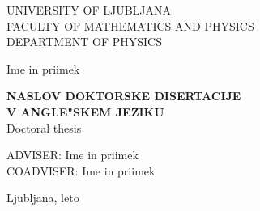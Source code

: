 \def\epsfg#1#2{\epsfig{file=#1.eps,width=#2}} 
\def\legendamp#1#2{\vbox{\hsize=#1\caption{\small #2}}}

\setcounter{topnumber}{4}
\setcounter{bottomnumber}{4}
\setcounter{totalnumber}{5}
\renewcommand{\topfraction}{0.99}
\renewcommand{\bottomfraction}{0.99}
\renewcommand{\textfraction}{0.0}
\setlength{\tabcolsep}{10pt}
\renewcommand{\arraystretch}{1.5}

\def\bi#1{\hbox{\boldmath{$#1$}}}
\let\oldvec\vec
\def\vec#1{\mbox{\boldmath$#1$}}
\def\pol{{\textstyle{1\over2}}}
\def\svec#1{\mbox{{\scriptsize \boldmath$#1$}}}



\nocite{*}


\pagestyle{empty}
\begin{center}

{\large UNIVERSITY OF LJUBLJANA\\
FACULTY OF MATHEMATICS AND PHYSICS\\
DEPARTMENT OF PHYSICS\\}

\vspace{4cm}

{\Large Ime in priimek\\}

\vspace{10mm}

{\bf \Large NASLOV DOKTORSKE DISERTACIJE\\
 V ANGLE"SKEM JEZIKU\\}
\vspace{5mm}
{\large Doctoral thesis}\\

\vfill

{\large ADVISER: Ime in priimek\\
COADVISER: Ime in priimek\\}

\vspace{2cm}
{\large Ljubljana, leto}

\end{center}


